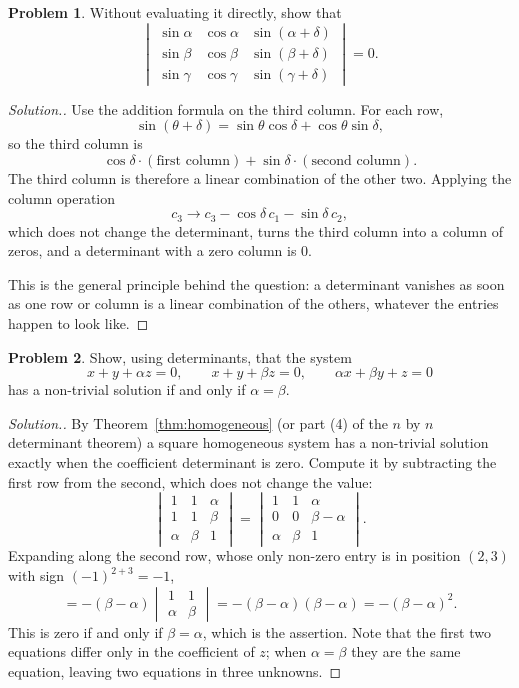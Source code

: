 \documentclass[11pt,a4paper]{article}
\theoremstyle{definition}
\newtheorem{problemx}{Problem}[section]
\newenvironment{problem}{\begin{problemx}}{\end{problemx}}
\newenvironment{solution}
  {\renewcommand{\qedsymbol}{}\begin{proof}[\textit{Solution}.]}
  {\end{proof}}
\begin{document}
\begin{problem}
Without evaluating it directly, show that
$$\begin{vmatrix}
\sin\alpha&\cos\alpha&\sin(\alpha+\delta)\\
\sin\beta&\cos\beta&\sin(\beta+\delta)\\
\sin\gamma&\cos\gamma&\sin(\gamma+\delta)\end{vmatrix}=0.$$
\end{problem}
\begin{solution}
Use the addition formula on the third column. For each row,
$$\sin(\theta+\delta)=\sin\theta\cos\delta+\cos\theta\sin\delta,$$
so the third column is
$$\cos\delta\cdot(\text{first column})+\sin\delta\cdot(\text{second column}).$$
The third column is therefore a linear combination of the other two. Applying
the column operation
$$c_3\rightarrow c_3-\cos\delta\,c_1-\sin\delta\,c_2,$$
which does not change the determinant, turns the third column into a column of
zeros, and a determinant with a zero column is $0$.

This is the general principle behind the question: a determinant vanishes as
soon as one row or column is a linear combination of the others, whatever the
entries happen to look like.
\end{solution}

\begin{problem}
Show, using determinants, that the system
$$x+y+\alpha z=0,\qquad x+y+\beta z=0,\qquad \alpha x+\beta y+z=0$$
has a non-trivial solution if and only if $\alpha=\beta$.
\end{problem}
\begin{solution}
By Theorem~\ref{thm:homogeneous} (or part (4) of the $n$ by $n$ determinant
theorem) a square homogeneous system has a non-trivial solution exactly when
the coefficient determinant is zero. Compute it by subtracting the first row
from the second, which does not change the value:
$$\begin{vmatrix}1&1&\alpha\\1&1&\beta\\\alpha&\beta&1\end{vmatrix}
=\begin{vmatrix}1&1&\alpha\\0&0&\beta-\alpha\\\alpha&\beta&1\end{vmatrix}.$$
Expanding along the second row, whose only non-zero entry is in position
$(2,3)$ with sign $(-1)^{2+3}=-1$,
$$=-(\beta-\alpha)\begin{vmatrix}1&1\\\alpha&\beta\end{vmatrix}
=-(\beta-\alpha)(\beta-\alpha)=-(\beta-\alpha)^2.$$
This is zero if and only if $\beta=\alpha$, which is the assertion. Note that
the first two equations differ only in the coefficient of $z$; when
$\alpha=\beta$ they are the same equation, leaving two equations in three
unknowns.
\end{solution}
\end{document}
